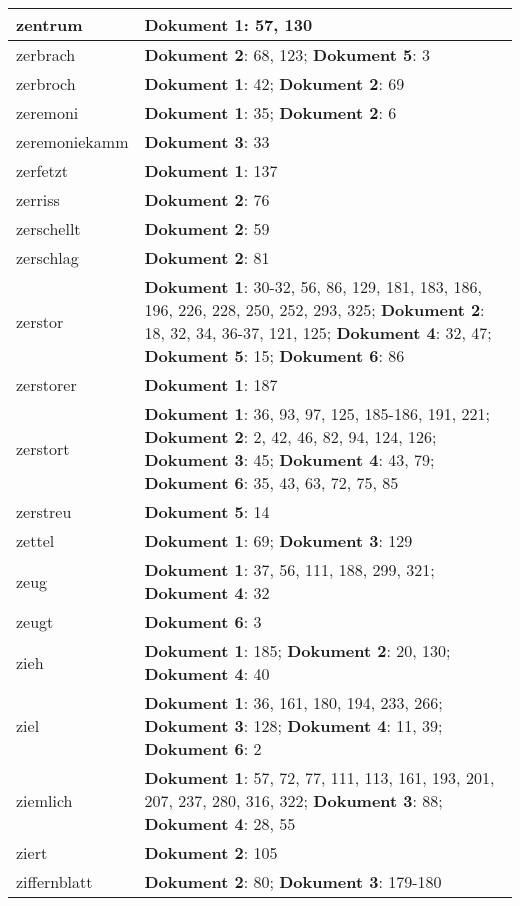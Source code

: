 \documentclass[a5paper]{article}
\begin{document}
\begin{longtable}[l]{|l|p{3in}|}
\hline
zentrum & \textbf{Dokument 1}: 57, 130 \\
\hline
zerbrach & \textbf{Dokument 2}: 68, 123; \textbf{Dokument 5}: 3 \\
\hline
zerbroch & \textbf{Dokument 1}: 42; \textbf{Dokument 2}: 69 \\
\hline
zeremoni & \textbf{Dokument 1}: 35; \textbf{Dokument 2}: 6 \\
\hline
zeremoniekamm & \textbf{Dokument 3}: 33 \\
\hline
zerfetzt & \textbf{Dokument 1}: 137 \\
\hline
zerriss & \textbf{Dokument 2}: 76 \\
\hline
zerschellt & \textbf{Dokument 2}: 59 \\
\hline
zerschlag & \textbf{Dokument 2}: 81 \\
\hline
zerstor & \textbf{Dokument 1}: 30-32, 56, 86, 129, 181, 183, 186, 196, 226, 228, 250, 252, 293, 325; \textbf{Dokument 2}: 18, 32, 34, 36-37, 121, 125; \textbf{Dokument 4}: 32, 47; \textbf{Dokument 5}: 15; \textbf{Dokument 6}: 86 \\
\hline
zerstorer & \textbf{Dokument 1}: 187 \\
\hline
zerstort & \textbf{Dokument 1}: 36, 93, 97, 125, 185-186, 191, 221; \textbf{Dokument 2}: 2, 42, 46, 82, 94, 124, 126; \textbf{Dokument 3}: 45; \textbf{Dokument 4}: 43, 79; \textbf{Dokument 6}: 35, 43, 63, 72, 75, 85 \\
\hline
zerstreu & \textbf{Dokument 5}: 14 \\
\hline
zettel & \textbf{Dokument 1}: 69; \textbf{Dokument 3}: 129 \\
\hline
zeug & \textbf{Dokument 1}: 37, 56, 111, 188, 299, 321; \textbf{Dokument 4}: 32 \\
\hline
zeugt & \textbf{Dokument 6}: 3 \\
\hline
zieh & \textbf{Dokument 1}: 185; \textbf{Dokument 2}: 20, 130; \textbf{Dokument 4}: 40 \\
\hline
ziel & \textbf{Dokument 1}: 36, 161, 180, 194, 233, 266; \textbf{Dokument 3}: 128; \textbf{Dokument 4}: 11, 39; \textbf{Dokument 6}: 2 \\
\hline
ziemlich & \textbf{Dokument 1}: 57, 72, 77, 111, 113, 161, 193, 201, 207, 237, 280, 316, 322; \textbf{Dokument 3}: 88; \textbf{Dokument 4}: 28, 55 \\
\hline
ziert & \textbf{Dokument 2}: 105 \\
\hline
ziffernblatt & \textbf{Dokument 2}: 80; \textbf{Dokument 3}: 179-180 \\

\end{longtable}
\end{document}
